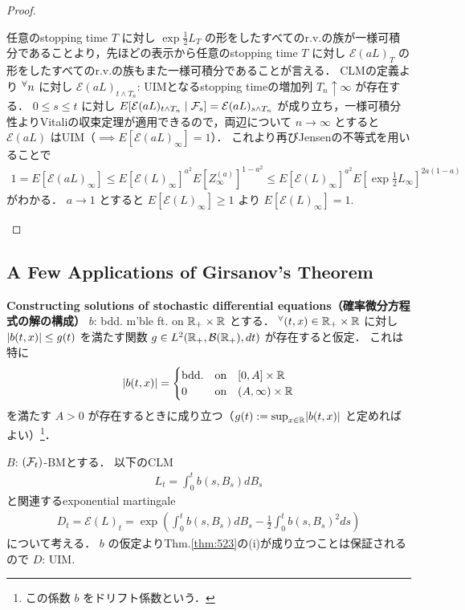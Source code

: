 \documentclass{jsarticle}
\begin{document}
\begin{proof}
\begin{description}
        任意のstopping time $T$ に対し $\exp\frac{1}{2}L_T$ の形をしたすべてのr.v.の族が一様可積分であることより，先ほどの表示から任意のstopping time $T$ に対し $\mathcal{E}(aL)_T$ の形をしたすべてのr.v.の族もまた一様可積分であることが言える．
        CLMの定義より ${}^{\forall} n$ に対し $\mathcal{E}(aL)_{t\wedge T_n}$: UIMとなるstopping timeの増加列 $T_n\uparrow\infty$ が存在する．
        $0\le s\le t$ に対し $E[\mathcal{E}(aL)_{t\wedge T_n}\mid\mathcal{F}_s]=\mathcal{E}(aL)_{s\wedge T_n}$ が成り立ち，一様可積分性よりVitaliの収束定理が適用できるので，両辺について $n\to\infty$ とすると $\mathcal{E}(aL)$ はUIM（$\implies E[\mathcal{E}(aL)_{\infty}]=1$）．
        これより再びJensenの不等式を用いることで
        \begin{align}
            1=E[\mathcal{E}(aL)_{\infty}]
            \le E[\mathcal{E}(L)_\infty]^{a^2}
            E[Z_{\infty}^{(a)}]^{1-a^2}
            \le E[\mathcal{E}(L)_\infty]^{a^2}
            E\left[\exp\frac{1}{2}L_\infty\right]^{2a(1-a)}
        \end{align}
        がわかる．
        $a\to1$ とすると $E[\mathcal{E}(L)_\infty]\ge1$ より $E[\mathcal{E}(L)_\infty]=1.$
    \end{description}
\end{proof}


\subsection{A Few Applications of Girsanov's Theorem}

\textbf{Constructing solutions of stochastic differential equations（確率微分方程式の解の構成）}
$b$: bdd. m'ble ft. on $\mathbb{R}_+\times\mathbb{R}$ とする．
${}^{\forall} (t,x)\in\mathbb{R}_+\times\mathbb{R}$ に対し $\lvert b(t,x)\rvert\le g(t)$ を満たす関数 $g\in L^2(\mathbb{R}_+,\mathcal{B}(\mathbb{R}_+),dt)$ が存在すると仮定．
これは特に
\begin{align}
    \lvert b(t,x)\rvert=
    \begin{cases}
        \text{bdd.} &\text{on}\quad [0,A]\times\mathbb{R} \\
        0 &\text{on}\quad (A,\infty)\times\mathbb{R}
    \end{cases}
\end{align}
を満たす $A>0$ が存在するときに成り立つ（$g(t):=\sup_{x\in\mathbb{R}}\lvert b(t,x)\rvert$ と定めればよい）\footnote{この係数 $b$ をドリフト係数という．}．

$B$: $(\mathcal{F}_t)$-BMとする．
以下のCLM
\begin{align}
    L_t=\int_0^t b(s,B_s)dB_s
\end{align}
と関連するexponential martingale
\begin{align}
    D_t
    = \mathcal{E}(L)_t
    = \exp\left(\int_0^t b(s,B_s)dB_s-\frac{1}{2}\int_0^t b(s,B_s)^2 ds\right)
\end{align}
について考える．
$b$ の仮定よりThm.\ref{thm:523}の(i)が成り立つことは保証されるので $D$: UIM.
\end{document}
